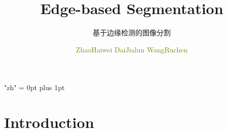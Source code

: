 \documentclass[notheorems,serif,table,compress]{beamer}  %
\begin{document}
\XeTeXlinebreaklocale "zh"         %
\XeTeXlinebreakskip = 0pt plus 1pt %
%


\title{Edge-based Segmentation}
\subtitle{基于边缘检测的图像分割}
\author[]{\textcolor{olive}{ZhaoHaiwei DaiJialun WangRuchen}}
\frame{ \titlepage }
\def\hilite<#1>{\temporal<#1>{\color{blue!15}}{\color{black}}{\color{black}}}
\newcommand{\shadow}[2][purple]{\hskip5pt\shadowbox{\color{#1}\small \kai #2\vspace{3mm}}}
\newcommand{\colorrbox}[2][purple]{\doublebox{\color{#1}\small \kai#2}}


\section{Introduction}
\end{document}
